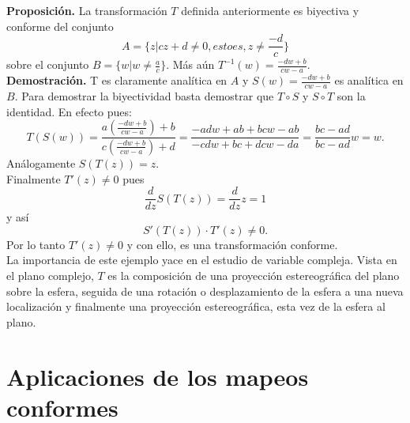 \documentclass[a4paper]{article}
\begin{document}
\textbf{Proposición.}
La transformación $T$ definida anteriormente es biyectiva y conforme del conjunto $$
A=\{z|cz+d \neq 0 , esto es, z \neq \frac{-d}{c}\}
$$ sobre el conjunto $B=\{w|w \neq \frac{a}{c}\}.$
Más aún $
T^{-1}(w)=\frac{-dw+b}{cw-a}.$\\
\textbf{Demostración.}
T es claramente analítica en $A$ y $S(w)=\frac{-dw+b}{cw-a}$ es analítica en $B.$ Para demostrar la biyectividad basta demostrar que $T\circ S$ y $S \circ T$ son la identidad. En efecto pues:$$
T(S(w))=\frac{a(\frac{-dw+b}{cw-a})+b}{c(\frac{-dw+b}{cw-a})+d}
=\frac{-adw+ab+bcw-ab}{-cdw+bc+dcw-da}
=\frac{bc-ad}{bc-ad}w=w.
$$ Análogamente $S(T(z))=z.$\\
Finalmente $T'(z)\neq 0$ pues $$
\frac{d}{dz}S(T(z))=\frac{d}{dz}z=1
$$ y así $$
S'(T(z)) \cdot T'(z) \neq 0.
$$ Por lo tanto $T'(z) \neq 0$ y con ello, es una transformación conforme.\\
La importancia de este ejemplo yace en el estudio de variable compleja.
Vista en el plano complejo, $T$ es la composición de una proyección estereográfica del plano sobre la esfera, seguida de una rotación o desplazamiento de la esfera a una nueva localización y finalmente una proyección estereográfica, esta vez de la esfera al plano.\\

\section{Aplicaciones de los mapeos conformes}
\end{document}

